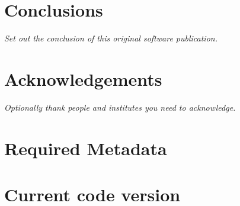 \documentclass[preprint,12pt, a4paper]{elsarticle}
\begin{document}
\section{Conclusions}\label{sec:conclusions}

{\em Set out the conclusion of this original software publication.}


\section*{Acknowledgements}

{\em Optionally thank people and institutes you need to acknowledge. }


 



\appendix


\section*{Required Metadata}\label{sec:metadata}


\section*{Current code version}\label{sec:src_version}

\end{document}
